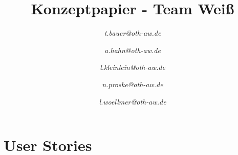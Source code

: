 \documentclass[conference]{IEEEtran}
\begin{document}
\title{Konzeptpapier - Team Weiß}
\author{
\textit{t.bauer@oth-aw.de}
\and
{}
\textit{a.hahn@oth-aw.de}
\and
{}
\textit{l.kleinlein@oth-aw.de}
\and
{}
\textit{n.proske@oth-aw.de}
\and
{}
\textit{l.woellmer@oth-aw.de}
}

\maketitle

\begin{abstract}
    
\end{abstract}

\begin{IEEEkeywords}
\end{IEEEkeywords}

\section{User Stories}
\end{document}
